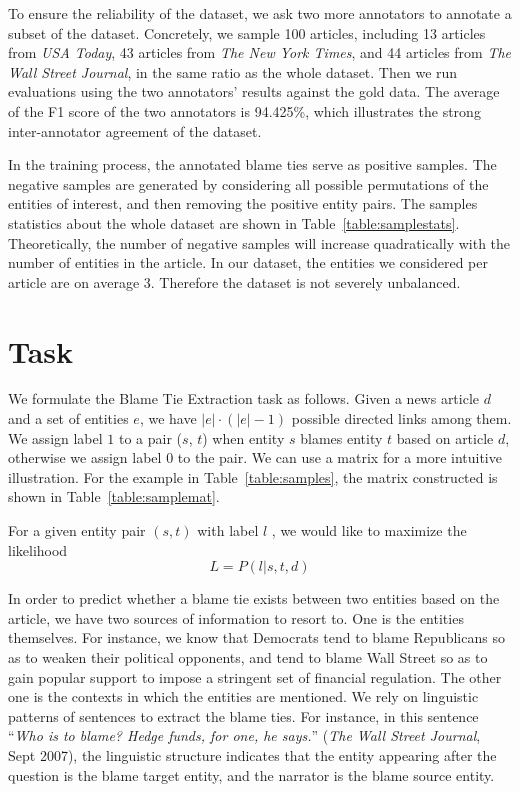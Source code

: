 \documentclass[letterpaper]{article} %
\begin{document}
To ensure the reliability of the dataset, we ask two more annotators to annotate a subset of the dataset. Concretely, we sample 100 articles, including 13 articles from {\it USA Today}, 43 articles from {\it The New York Times}, and 44 articles from {\it The Wall Street Journal}, in the same ratio as the whole dataset. Then we run evaluations using the two annotators' results against the gold data. The average of the F1 score of the two annotators is 94.425\%, which illustrates the strong inter-annotator agreement of the dataset.

In the training process, the annotated blame ties serve as positive samples. The negative samples are generated by considering all possible permutations of the entities of interest, and then removing the positive entity pairs. The samples statistics about the whole dataset are shown in Table~\ref{table:samplestats}. Theoretically, the number of negative samples will increase quadratically with the number of entities in the article. In our dataset, the entities we considered per article are on average 3. Therefore the dataset is not severely unbalanced. 

\section{Task}

We formulate the Blame Tie Extraction task as follows. Given a news article $d$ and a set of entities $e$, we have $ |e| \cdot (|e| - 1)$ possible directed links among them. We assign label $1$ to a pair ($s$, $t$) when entity $s$ blames entity $t$ based on article $d$, otherwise we assign label $0$ to the pair. We can use a matrix for a more intuitive illustration. For the example in Table~\ref{table:samples}, the matrix constructed is shown in Table~\ref{table:samplemat}.

For a given entity pair $(s, t)$ with label $l$ , we would like to maximize the likelihood $$L = P(l | s, t, d)$$

In order to predict whether a blame tie exists between two entities based on the article, we have two sources of information to resort to. One is the entities themselves. For instance, we know that Democrats tend to blame Republicans so as to weaken their political opponents, and tend to blame Wall Street so as to gain popular support to impose a stringent set of financial regulation. The other one is the contexts in which the entities are mentioned. We rely on linguistic patterns of sentences to extract the blame ties. For instance, in this sentence ``{\it Who is to blame? Hedge funds, for one, he says.}'' ({\it The Wall Street Journal}, Sept 2007), the linguistic structure indicates that the entity appearing after the question is the blame target entity, and the narrator is the blame source entity.
\end{document}

